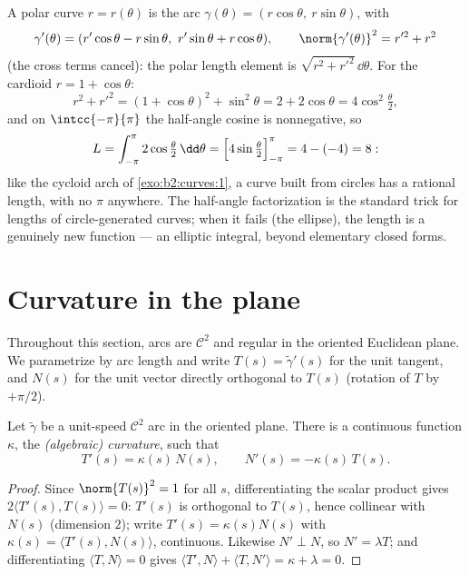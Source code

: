 \begin{example}\label{ex:b2:curves:polarlength}
A polar curve $r = r(\theta)$ is the arc $\gamma(\theta) =
(r\cos\theta,\ r\sin\theta)$, with
\[
\gamma'(\theta) = (r'\cos\theta - r\sin\theta,\
r'\sin\theta + r\cos\theta),
\qquad
\norm{\gamma'(\theta)}^2 = r'^2 + r^2
\]
(the cross terms cancel): the polar length element is
$\sqrt{r^2 + r'^2}\,\dd\theta$. For the cardioid $r = 1 +
\cos\theta$:
\[
r^2 + r'^2 = (1 + \cos\theta)^2 + \sin^2\theta = 2 +
2\cos\theta = 4\cos^2\tfrac\theta2,
\]
and on $\intcc{-\pi}{\pi}$ the half-angle cosine is
nonnegative, so
\[
L = \int_{-\pi}^{\pi}2\cos\tfrac\theta2\,\dd\theta
= \Bigl[4\sin\tfrac\theta2\Bigr]_{-\pi}^{\pi}
= 4 - (-4) = 8 :
\]
like the cycloid arch of \cref{exo:b2:curves:1}, a curve
built from circles has a rational length, with no $\pi$
anywhere. The half-angle factorization is the standard trick
for lengths of circle-generated curves; when it fails (the
ellipse), the length is a genuinely new function --- an
elliptic integral, beyond elementary closed forms.
\end{example}

\section{Curvature in the plane}

Throughout this section, arcs are $\mathcal{C}^2$ and regular in
the oriented Euclidean plane. We parametrize by arc length and
write $T(s) = \tilde\gamma'(s)$ for the unit tangent, and $N(s)$
for the unit vector directly orthogonal to $T(s)$ (rotation of
$T$ by $+\pi/2$).

\begin{theorem}\label{thm:b2:curves:frenet2d}
Let $\tilde\gamma$ be a unit-speed $\mathcal{C}^2$ arc in the
oriented plane. There is a continuous function $\kappa$, the
\emph{(algebraic) curvature}, such that
\[
T'(s) = \kappa(s)\, N(s),
\qquad
N'(s) = -\kappa(s)\, T(s).
\]
\end{theorem}

\begin{proof}
Since $\norm{T(s)}^2 = 1$ for all $s$, differentiating the scalar
product gives $2\langle T'(s), T(s)\rangle = 0$: $T'(s)$ is orthogonal to
$T(s)$, hence collinear with $N(s)$ (dimension $2$); write $T'(s)
= \kappa(s) N(s)$ with $\kappa(s) = \langle T'(s), N(s)\rangle$,
continuous. Likewise $N' \perp N$, so $N' = \lambda T$; and
differentiating $\langle T, N\rangle = 0$ gives $\langle T', N\rangle +
\langle T, N'\rangle = \kappa + \lambda = 0$.
\end{proof}

